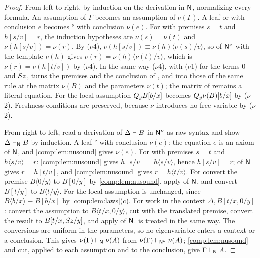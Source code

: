 \begin{proof}
From left to right, by induction on the derivation in $\mathsf{N}$, normalizing
every formula. An assumption of $\Gamma$ becomes an assumption of
$\nu(\Gamma)$. A leaf  or  with conclusion $e$
becomes $^{\nu}$ with conclusion $\nu(e)$. For 
with premises $s=t$ and $h[s/v]=r$, the induction hypotheses are
$\nu(s)=\nu(t)$ and $\nu(h[s/v])=\nu(r)$. By ($\nu$4),
$\nu(h[s/v])\equiv\nu(h)\langle\nu(s)/v\rangle$, so  of
$\mathsf{N}^{\nu}$ with the template $\nu(h)$ gives
$\nu(r)=\nu(h)\langle\nu(t)/v\rangle$, which is $\nu(r)=\nu(h[t/v])$ by
($\nu$4). In the same way ($\nu$4), with ($\nu$1) for the terms $0$ and
$S z$, turns the premises and the conclusion of ,
 and  into those of the same rule at the matrix
$\nu(B)$ and the parameters $\nu(t)$; the matrix of  remains a
literal equation. For  the local assumption $Q_{y}B[b/x]$
becomes $Q_{y}\nu(B)[b/x]$ by ($\nu$2). Freshness conditions are preserved,
because $\nu$ introduces no free variable by ($\nu$2).

From right to left, read a derivation of $\Delta\vdash B$ in $\mathsf{N}^{\nu}$
as raw syntax and show $\Delta\vdash_{\mathsf{N}}B$ by induction. A leaf
$^{\nu}$ with conclusion $\nu(e)$: the equation $e$ is an
axiom of $\mathsf{N}$, and \cref{comp:lem:nusound} gives $\nu(e)$. For
 with premises $s=t$ and $h\langle s/v\rangle=r$:
\cref{comp:lem:nusound} gives $h[s/v]=h\langle s/v\rangle$, hence
$h[s/v]=r$;  of $\mathsf{N}$ gives $r=h[t/v]$, and
\cref{comp:lem:nusound} gives $r=h\langle t/v\rangle$. For 
convert the premise $B\langle0/y\rangle$ to $B[0/y]$ by
\cref{comp:lem:nusound}, apply  of $\mathsf{N}$, and convert
$B[t/y]$ to $B\langle t/y\rangle$. For  the local assumption
is unchanged, since $B\langle b/x\rangle\equiv B[b/x]$ by
\cref{comp:lem:laws}(c). For  work in the context
$\Delta,B[t/x,0/y]$: convert the assumption to
$B\langle t/x,0/y\rangle$, cut with the translated premise, convert the
result to $B[t/x,S z/y]$, and apply  of $\mathsf{N}$.
 is treated in the same way. The conversions are uniform in the
parameters, so no eigenvariable enters a context or a conclusion. This gives
$\nu(\Gamma)\vdash_{\mathsf{N}}\nu(A)$ from
$\nu(\Gamma)\vdash_{\mathsf{N}^{\nu}}\nu(A)$; \cref{comp:lem:nusound} and cut,
applied to each assumption and to the conclusion, give
$\Gamma\vdash_{\mathsf{N}}A$.
\end{proof}

